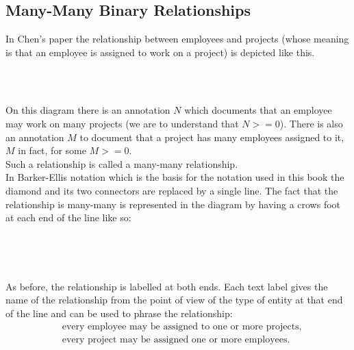 \subsection{Many-Many Binary Relationships}
In Chen's paper the relationship between employees and projects (whose meaning is that
an employee is assigned to work on a project) is depicted like this.
\begin{gather}
\label{projectWorkerChenStyle}
\raisebox{-0.9cm}{\scalebox{0.9}{

}}
\end{gather}
On this diagram there is an annotation $N$ which documents that an employee may work on many projects (we are to understand that $N >= 0$). There is also an annotation $M$ to document that
a project has many employees assigned to it, $M$ in fact, for some $M >= 0$. \\
\noindent Such a relationship is called a many-many relationship.  \\
\noindent In Barker-Ellis notation which is the basis for the notation used in this book the diamond and its two connectors are replaced by a single line. The fact that the relationship is many-many is represented in the diagram by having a crows foot at each end of the line like so:

\begin{gather}
\label{employeeProjectWorker}
\raisebox{-1cm}{

}
\end{gather}

\noindent As before, the relationship is labelled at both ends. Each text label gives the name of the relationship from the point of view of the type of entity at that end of the line and can be used to phrase the relationship:
\begin{align}
\label{assignedToText}&\mbox{every employee may be assigned to one or more projects,} \\
\label{assignedText}&\mbox{every project may be assigned one or more employees.}
\end{align}
\newpage
